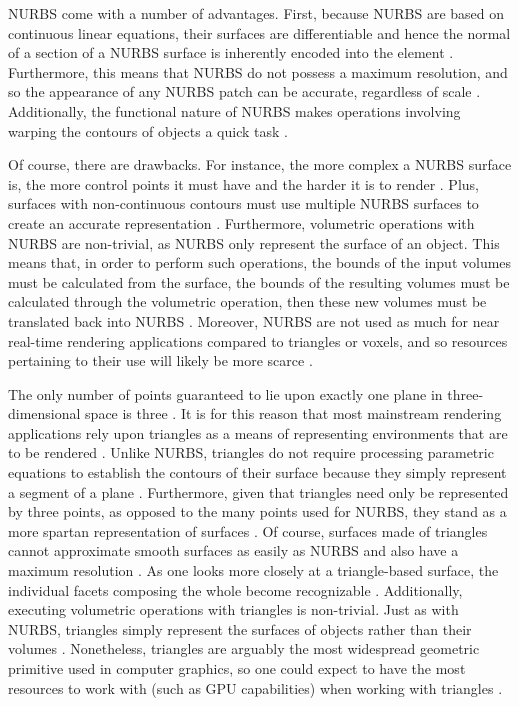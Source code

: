 \documentclass[onecolumn, draftclsnofoot,10pt, compsoc]{IEEEtran}
\newcounter{threesection}[subsubsection]
\begin{document}
NURBS come with a number of advantages.
First, because NURBS are based on continuous linear equations, their surfaces are differentiable and hence the normal of a section of a NURBS surface is inherently encoded into the element \cite{2}.
Furthermore, this means that NURBS do not possess a maximum resolution, and so the appearance of any NURBS patch can be accurate, regardless of scale \cite{2}.
Additionally, the functional nature of NURBS makes operations involving warping the contours of objects a quick task \cite{2}.

Of course, there are drawbacks.
For instance, the more complex a NURBS surface is, the more control points it must have and the harder it is to render \cite{2}.
Plus, surfaces with non-continuous contours must use multiple NURBS surfaces to create an accurate representation \cite{1}.
Furthermore, volumetric operations with NURBS are non-trivial, as NURBS only represent the surface of an object. 
This means that, in order to perform such operations, the bounds of the input volumes must be calculated from the surface, the bounds of the resulting volumes must be calculated through the volumetric operation, then these new volumes must be translated back into NURBS \cite{1}\cite{2}. 
Moreover, NURBS are not used as much for near real-time rendering applications compared to triangles or voxels, and so resources pertaining to their use will likely be more scarce \cite{1}.




The only number of points guaranteed to lie upon exactly one plane in three-dimensional space is three \cite{1}.
It is for this reason that most mainstream rendering applications rely upon triangles as a means of representing environments that are to be rendered \cite{1}.
Unlike NURBS, triangles do not require processing parametric equations to establish the contours of their surface because they simply represent a segment of a plane \cite{1}.
Furthermore, given that triangles need only be represented by three points, as opposed to the many points used for NURBS, they stand as a more spartan representation of surfaces \cite{1}.
Of course, surfaces made of triangles cannot approximate smooth surfaces as easily as NURBS and also have a maximum resolution \cite{1}.
As one looks more closely at a triangle-based surface, the individual facets composing the whole become recognizable \cite{1}.
Additionally, executing volumetric operations with triangles is non-trivial. Just as with NURBS, triangles simply represent the surfaces of objects rather than their volumes \cite{1}.
Nonetheless, triangles are arguably the most widespread geometric primitive used in computer graphics, so one could expect to have the most resources to work with (such as GPU capabilities) when working with triangles \cite{1}.
\end{document}
